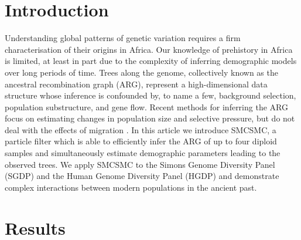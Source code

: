 \documentclass{article}
\begin{document}
\section{Introduction}

Understanding global patterns of genetic variation requires a firm characterisation of their origins in Africa. Our knowledge of prehistory in Africa is limited, at least in part due to the complexity of inferring demographic models over long periods of time. Trees along the genome, collectively known as the ancestral recombination graph (ARG), represent a high-dimensional data structure whose inference is confounded by, to name a few, background selection, population substructure, and gene flow. Recent methods for inferring the ARG focus on estimating changes in population size and selective pressure, but do not deal with the effects of migration \cite{Speidel2019, Kelleher2019}. In this article we introduce SMCSMC, a particle filter which is able to efficiently infer the ARG of up to four diploid samples and simultaneously estimate demographic parameters leading to the observed trees.  We apply SMCSMC to the Simons Genome Diversity Panel (SGDP) and the Human Genome Diversity Panel (HGDP) and demonstrate complex interactions between modern populations in the ancient past.


\section{Results}
\end{document}
